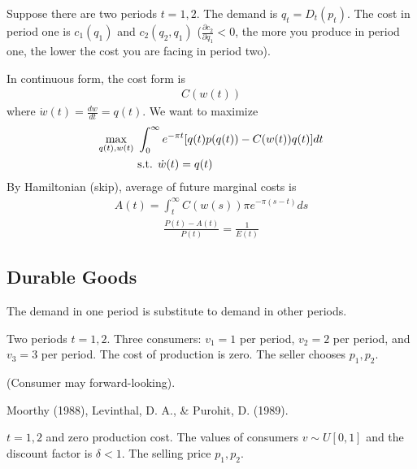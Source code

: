 \documentclass[11pt]{elegantbook}
\begin{document}
\begin{example}
    Suppose there are two periods $t=1,2$. The demand is $q_t=D_t(p_t)$. The cost in period one is $c_1(q_1)$ and $c_2(q_2,q_1)$ ($\frac{\partial c_2}{\partial q_1}<0$, the more you produce in period one, the lower the cost you are facing in period two).
\end{example}
In continuous form, the cost form is
\begin{equation}
    \begin{aligned}
        C(w(t))
    \end{aligned}
    \nonumber
\end{equation}
where $\dot{w}(t)=\frac{d w}{d t}=q(t)$. We want to maximize
\begin{equation}
    \begin{aligned}
        \max_{q(t),w(t)}\ &\int_0^\infty e^{-\pi t}[q(t)p(q(t))-C(w(t))q(t)]dt\\
        &\textnormal{s.t. }\dot{w}(t)=q(t)
    \end{aligned}
    \nonumber
\end{equation}
By Hamiltonian (skip), average of future marginal costs is
\begin{equation}
    \begin{aligned}
        A(t)=\int_t^\infty C(w(s))\pi e^{-\pi(s-t)}ds
    \end{aligned}
    \nonumber
\end{equation}
\begin{equation}
    \begin{aligned}
        \frac{P(t)-A(t)}{P(t)}=\frac{1}{E(t)}
    \end{aligned}
    \nonumber
\end{equation}

\subsection{Durable Goods}
The demand in one period is substitute to demand in other periods.
\begin{example}
    Two periods $t=1,2$. Three consumers: $v_1=1$ per period, $v_2=2$ per period, and $v_3=3$ per period. The cost of production is zero. The seller chooses $p_1,p_2$.
\end{example}
(Consumer may forward-looking).


Moorthy (1988), Levinthal, D. A., \& Purohit, D. (1989).

$t=1,2$ and zero production cost. The values of consumers $v\sim U[0,1]$ and the discount factor is $\delta<1$. The selling price $p_1,p_2$.
\end{document}
